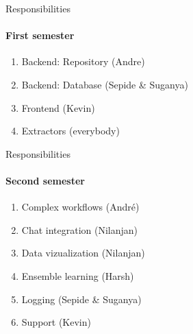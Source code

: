 \begin{frame}{Responsibilities}
\framesubtitle{First semester}
	\begin{enumerate}
		\item Backend: Repository (Andre)
		\item Backend: Database (Sepide \& Suganya)
		\item Frontend (Kevin)
		\item Extractors (everybody)
	\end{enumerate}
\end{frame}

\begin{frame}{Responsibilities}
\framesubtitle{Second semester}
	\begin{enumerate}
		\item Complex workflows (André)
		\item Chat integration (Nilanjan)
		\item Data vizualization (Nilanjan)
		\item Ensemble learning  (Harsh)
		\item Logging (Sepide \& Suganya)
		\item Support (Kevin)
	\end{enumerate}
\end{frame}